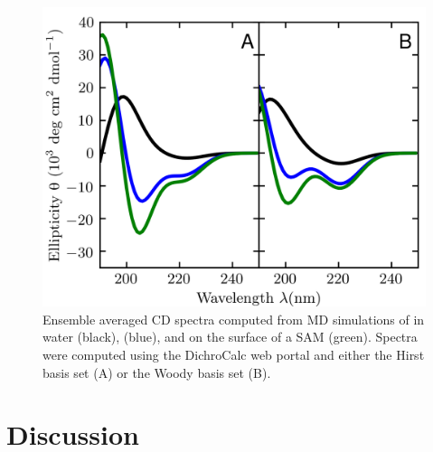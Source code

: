 \begin{figure}
    \center
    \includegraphics[width=\single]{figures-helix/combined_cd_spectra.png}
    \caption{
        Ensemble averaged CD spectra computed from MD simulations of \pep{} in water (black), \tbawat{} (blue), and on the surface of a SAM (green). 
        Spectra were computed using the DichroCalc web portal and either the Hirst basis set\cite{Hirst1998, Besley1999} (A) or the Woody basis set\cite{Woody1999} (B).
    }
    \label{fig:helix-avg_cd}
\end{figure}

\section{Discussion}

